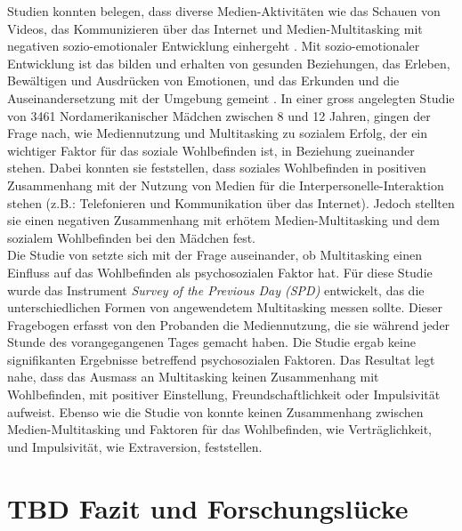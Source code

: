 Studien konnten belegen, dass diverse Medien-Aktivitäten wie das Schauen von Videos, das Kommunizieren über das Internet und Medien-Multitasking mit negativen sozio-emotionaler Entwicklung einhergeht \cite{Funk1996, Rideout2010, Pea2012}. Mit sozio-emotionaler Entwicklung ist das bilden und erhalten von gesunden Beziehungen, das Erleben, Bewältigen und Ausdrücken von Emotionen, und das Erkunden und die Auseinandersetzung mit der Umgebung gemeint \cite{Hymes1952, Lerner2000}. In einer gross angelegten Studie von 3461 Nordamerikanischer Mädchen zwischen 8 und 12 Jahren, gingen  der Frage nach, wie Mediennutzung und Multitasking zu sozialem Erfolg, der ein wichtiger Faktor für das soziale Wohlbefinden ist, in Beziehung zueinander stehen. Dabei konnten sie feststellen, dass soziales Wohlbefinden in positiven Zusammenhang mit der Nutzung von Medien für die Interpersonelle-Interaktion stehen (z.B.: Telefonieren und Kommunikation über das Internet). Jedoch stellten sie einen negativen Zusammenhang mit erhötem Medien-Multitasking und dem sozialem Wohlbefinden bei den Mädchen fest.\\
Die Studie von  setzte sich mit der Frage auseinander, ob Multitasking einen Einfluss auf das Wohlbefinden als psychosozialen Faktor hat. Für diese Studie wurde das Instrument \textit{Survey of the Previous Day (SPD)} entwickelt, das die unterschiedlichen Formen von angewendetem Multitasking messen sollte. Dieser Fragebogen erfasst von den Probanden die Mediennutzung, die sie während jeder Stunde des vorangegangenen Tages gemacht haben. Die Studie ergab keine signifikanten Ergebnisse betreffend psychosozialen Faktoren. Das Resultat legt nahe, dass das Ausmass an Multitasking keinen Zusammenhang mit Wohlbefinden, mit positiver Einstellung, Freundschaftlichkeit oder Impulsivität aufweist. Ebenso wie die Studie von  konnte keinen Zusammenhang zwischen Medien-Multitasking und Faktoren für das Wohlbefinden, wie Verträglichkeit, und Impulsivität, wie Extraversion, feststellen.
\section{TBD Fazit und Forschungslücke}\label{section.fazitLücke}
